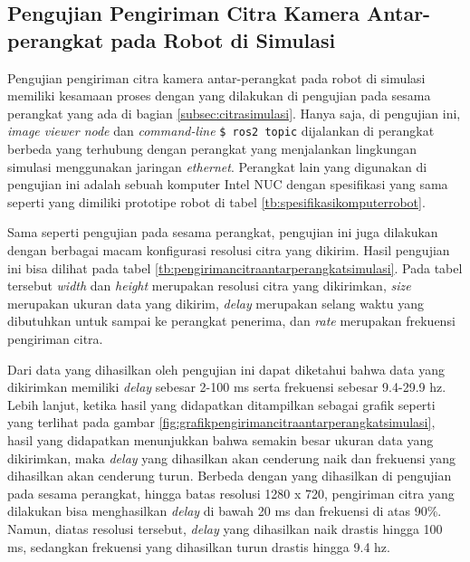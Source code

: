\subsection{Pengujian Pengiriman Citra Kamera Antar-perangkat pada Robot di Simulasi}
\label{subsec:citraantarperangkatsimulasi}

Pengujian pengiriman citra kamera antar-perangkat pada robot di simulasi memiliki kesamaan proses dengan yang dilakukan di pengujian pada sesama perangkat yang ada di bagian \ref{subsec:citrasimulasi}.
Hanya saja, di pengujian ini, \emph{image viewer node} dan \emph{command-line} \lstinline{$ ros2 topic} dijalankan di perangkat berbeda yang terhubung dengan perangkat yang menjalankan lingkungan simulasi menggunakan jaringan \emph{ethernet}.
Perangkat lain yang digunakan di pengujian ini adalah sebuah komputer Intel NUC dengan spesifikasi yang sama seperti yang dimiliki prototipe robot di tabel \ref{tb:spesifikasikomputerrobot}.



Sama seperti pengujian pada sesama perangkat,
  pengujian ini juga dilakukan dengan berbagai macam konfigurasi resolusi citra yang dikirim.
Hasil pengujian ini bisa dilihat pada tabel \ref{tb:pengirimancitraantarperangkatsimulasi}.
Pada tabel tersebut \emph{width} dan \emph{height} merupakan resolusi citra yang dikirimkan,
  \emph{size} merupakan ukuran data yang dikirim,
  \emph{delay} merupakan selang waktu yang dibutuhkan untuk sampai ke perangkat penerima,
  dan \emph{rate} merupakan frekuensi pengiriman citra.



Dari data yang dihasilkan oleh pengujian ini dapat diketahui bahwa data yang dikirimkan memiliki \emph{delay} sebesar 2-100 ms serta frekuensi sebesar 9.4-29.9 hz.
Lebih lanjut, ketika hasil yang didapatkan ditampilkan sebagai grafik seperti yang terlihat pada gambar \ref{fig:grafikpengirimancitraantarperangkatsimulasi},
  hasil yang didapatkan menunjukkan bahwa semakin besar ukuran data yang dikirimkan,
  maka \emph{delay} yang dihasilkan akan cenderung naik dan frekuensi yang dihasilkan akan cenderung turun.
Berbeda dengan yang dihasilkan di pengujian pada sesama perangkat,
  hingga batas resolusi 1280 x 720,
  pengiriman citra yang dilakukan bisa menghasilkan \emph{delay} di bawah 20 ms dan frekuensi di atas 90\%.
Namun, diatas resolusi tersebut,
  \emph{delay} yang dihasilkan naik drastis hingga 100 ms,
  sedangkan frekuensi yang dihasilkan turun drastis hingga 9.4 hz.
